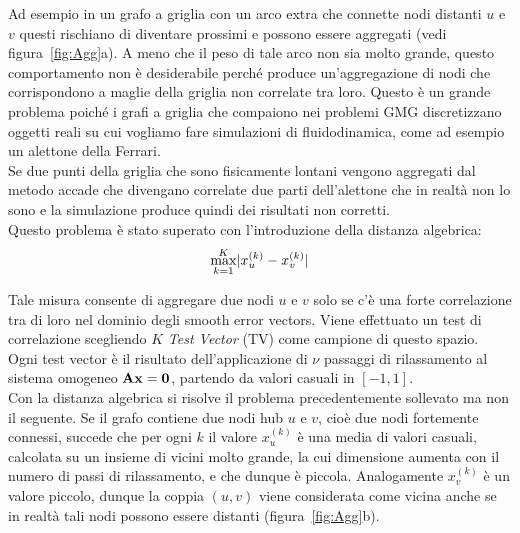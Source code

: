 Ad esempio in un grafo a griglia con un arco extra che connette nodi distanti $u$ e $v$ questi rischiano di diventare prossimi e possono essere aggregati (vedi figura~\vref{fig:Agg}a).
A meno che il peso di tale arco non sia molto grande, questo comportamento non è desiderabile perché produce un'aggregazione di nodi che corrispondono a maglie della griglia non correlate tra loro.
Questo è un grande problema poiché i grafi a griglia che compaiono nei problemi GMG discretizzano oggetti reali su cui vogliamo fare simulazioni di fluidodinamica, come ad esempio un alettone della Ferrari.\\
Se due punti della griglia che sono fisicamente lontani vengono aggregati dal metodo accade che divengano correlate due parti dell'alettone che in realtà non lo sono e la simulazione produce quindi dei risultati non corretti.\\
Questo problema è stato superato con l'introduzione della distanza algebrica:
\begin{equation}
\label{eqn:AlgebraicDistance}
\max_{k=1}^K \lvert x_u^{(k)} - x_v^{(k)} \rvert
\end{equation}

Tale misura consente di aggregare due nodi $u$ e $v$ solo se c'è una forte correlazione tra di loro nel dominio degli smooth error vectors.
Viene effettuato un test di correlazione scegliendo $K$ \emph{Test Vector} (TV) come campione di questo spazio.
Ogni test vector è il risultato dell'applicazione di $\nu$ passaggi di rilassamento al sistema omogeneo $\mathbf{Ax}=\mathbf{0}$, partendo da valori casuali in $[-1,1]$.\\
Con la distanza algebrica si risolve il problema precedentemente sollevato ma non il seguente.
Se il grafo contiene due nodi hub $u$ e $v$, cioè due nodi fortemente connessi, succede che per ogni $k$ il valore $x_u^{(k)}$ è una media di valori casuali, calcolata su un insieme di vicini molto grande, la cui dimensione aumenta con il numero di passi di rilassamento, e che dunque è piccola. Analogamente $x_v^{(k)}$ è un valore piccolo, dunque la coppia $(u,v)$ viene considerata come vicina anche se in realtà tali nodi possono essere distanti (figura~\vref{fig:Agg}b).

